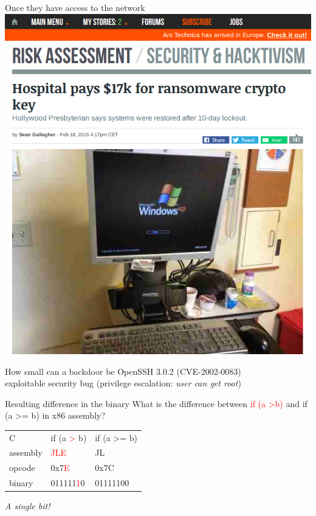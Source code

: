 \documentclass[11pt]{beamer}
\begin{document}
\begin{frame}{Once they have access to the network}
\includegraphics[scale=0.28]{ransomware.png}
\end{frame}

\begin{frame}{How small can a backdoor be}
OpenSSH 3.0.2 (CVE-2002-0083)\\
exploitable security bug (privilege escalation: \emph{user can get root}) 

\end{frame}

\begin{frame}{Resulting difference in the binary}
What is the difference between \textcolor{red}{if (a \textgreater b)} and \textcolor{mygreen}{if (a \textgreater= b)} in x86 assembly? 
\begin{flushleft}
\begin{table}[]
\begin{tabular}{| l | l | l |}
\hline
C        & if (a \textcolor{red}{\textgreater} b) & if (a \textcolor{mygreen}{\textgreater=} b)   \\
assembly & \textcolor{red}{JLE}                   & \textcolor{mygreen}{JL}                       \\
opcode   & 0x7\textcolor{red}{E}                  & 0x7\textcolor{mygreen}{C}                     \\
binary   & 011111\textcolor{red}{1}0              & 011111\textcolor{mygreen}{0}0                 \\
\hline
\end{tabular}
\end{table}
\end{flushleft}
\emph{A single bit!}
\end{frame}
\end{document}
